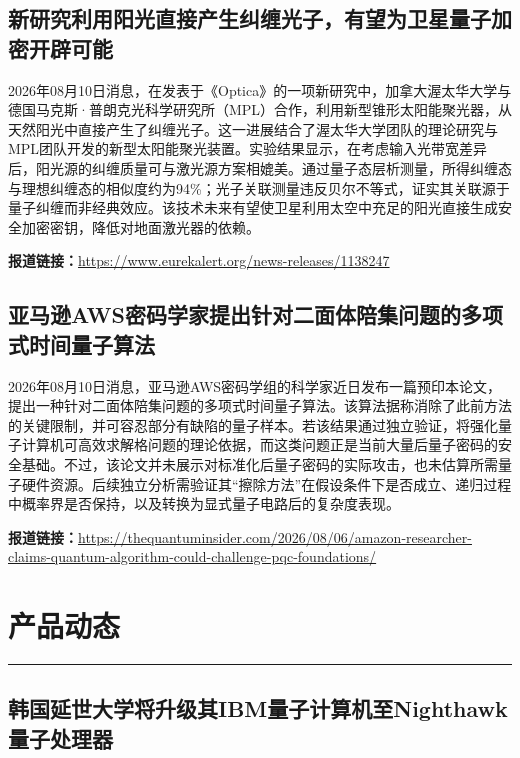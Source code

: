 \documentclass[12pt,a4paper]{ctexart}
\begin{document}
\subsection{ 新研究利用阳光直接产生纠缠光子，有望为卫星量子加密开辟可能 }

2026年08月10日消息，在发表于《Optica》的一项新研究中，加拿大渥太华大学与德国马克斯·普朗克光科学研究所（MPL）合作，利用新型锥形太阳能聚光器，从天然阳光中直接产生了纠缠光子。这一进展结合了渥太华大学团队的理论研究与MPL团队开发的新型太阳能聚光装置。实验结果显示，在考虑输入光带宽差异后，阳光源的纠缠质量可与激光源方案相媲美。通过量子态层析测量，所得纠缠态与理想纠缠态的相似度约为94\%；光子关联测量违反贝尔不等式，证实其关联源于量子纠缠而非经典效应。该技术未来有望使卫星利用太空中充足的阳光直接生成安全加密密钥，降低对地面激光器的依赖。

\noindent\textbf{报道链接：}\url{https://www.eurekalert.org/news-releases/1138247}

\subsection{ 亚马逊AWS密码学家提出针对二面体陪集问题的多项式时间量子算法 }

2026年08月10日消息，亚马逊AWS密码学组的科学家近日发布一篇预印本论文，提出一种针对二面体陪集问题的多项式时间量子算法。该算法据称消除了此前方法的关键限制，并可容忍部分有缺陷的量子样本。若该结果通过独立验证，将强化量子计算机可高效求解格问题的理论依据，而这类问题正是当前大量后量子密码的安全基础。不过，该论文并未展示对标准化后量子密码的实际攻击，也未估算所需量子硬件资源。后续独立分析需验证其“擦除方法”在假设条件下是否成立、递归过程中概率界是否保持，以及转换为显式量子电路后的复杂度表现。

\noindent\textbf{报道链接：}\url{https://thequantuminsider.com/2026/08/06/amazon-researcher-claims-quantum-algorithm-could-challenge-pqc-foundations/}


\newpage
\section{产品动态}
\vspace{-0.5em}
\noindent\rule{\linewidth}{1.5pt}

\subsection{ 韩国延世大学将升级其IBM量子计算机至Nighthawk量子处理器 }
\end{document}
